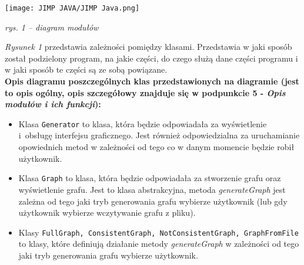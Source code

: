 \documentclass[12pt, a4paper]{article}
\begin{document}
\begin{center}
\texttt{[image: JIMP JAVA/JIMP Java.png]}
\caption{\textit{rys. 1 -- diagram modułów} \label{overflow}}
\end{center}

\textit{Rysunek 1} przedstawia zależności pomiędzy klasami. Przedstawia w jaki sposób został podzielony program, na jakie części, do czego służą dane części programu i w jaki sposób te części są ze sobą powiązane.\\

\textbf{Opis diagramu poszczególnych klas przedstawionych na diagramie (jest to opis ogólny, opis szczegółowy znajduje się w podpunkcie 5 - \textit{Opis modułów i ich funkcji}):}

\begin{itemize}
    \item Klasa \texttt{Generator} to klasa, która będzie odpowiadała za wyświetlenie i~obsługę interfejsu graficznego. Jest również odpowiedzialna za uruchamianie opowiednich metod w zależności od tego co w danym momencie będzie robił użytkownik.
    \item Klasa \texttt{Graph} to klasa, która będzie odpowiadała za stworzenie grafu oraz wyświetlenie grafu. Jest to klasa abstrakcyjna, metoda \textit{generateGraph} jest zależna od tego jaki tryb generowania grafu wybierze użytkownik (lub gdy użytkownik wybierze wczytywanie grafu z pliku).
    \item Klasy \texttt{FullGraph, ConsistentGraph, NotConsistentGraph, GraphFromFile} to klasy, które definiują działanie metody \textit{generateGraph} w zależności od tego jaki tryb generowania grafu wybierze użytkownik.
    

\end{itemize}
\end{document}
